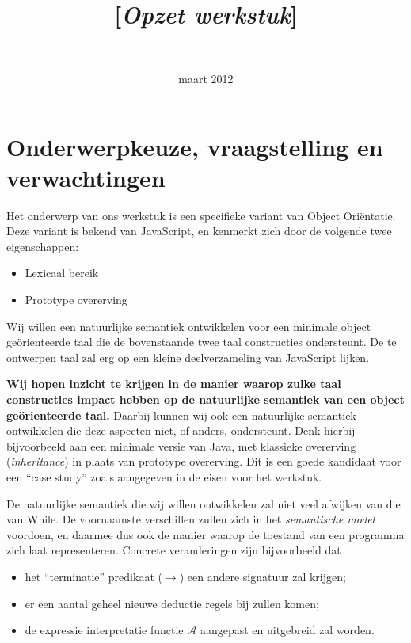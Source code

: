 \documentclass[a4paper,11pt]{article}
\title{\Title \\ {\Large [\textit{Opzet werkstuk}]}}
\author{\Kelley \\ \Tim}
\date{maart 2012}
\begin{document}
\maketitle
\thispagestyle{fancy}

\section*{Onderwerpkeuze, vraagstelling en verwachtingen}

Het onderwerp van ons werkstuk is een specifieke variant van Object Oriëntatie. Deze variant is bekend van JavaScript, en kenmerkt zich door de volgende twee eigenschappen:

\begin{itemize}
	\item Lexicaal bereik
	\item Prototype overerving
\end{itemize}

Wij willen een natuurlijke semantiek ontwikkelen voor een minimale object geörienteerde taal die de bovenstaande twee taal constructies ondersteunt. De te ontwerpen taal zal erg op een kleine deelverzameling van JavaScript lijken.

\textbf{Wij hopen inzicht te krijgen in de manier waarop zulke taal constructies impact hebben op de natuurlijke semantiek van een object geörienteerde taal.} Daarbij kunnen wij ook een natuurlijke semantiek ontwikkelen die deze aspecten niet, of anders, ondersteunt. Denk hierbij bijvoorbeeld aan een minimale versie van Java, met klassieke overerving (\emph{inheritance}) in plaats van prototype overerving. Dit is een goede kandidaat voor een “case study” zoals aangegeven in de eisen voor het werkstuk.

De natuurlijke semantiek die wij willen ontwikkelen zal niet veel afwijken van die van While. De voornaamste verschillen zullen zich in het \emph{semantische model} voordoen, en daarmee dus ook de manier waarop de toestand van een programma zich laat representeren. Concrete veranderingen zijn bijvoorbeeld dat

\begin{itemize}
	\item het “terminatie” predikaat ($\longrightarrow$) een andere signatuur zal krijgen;
	\item er een aantal geheel nieuwe deductie regels bij zullen komen;
	\item de expressie interpretatie functie $\mathcal{A}$ aangepast en uitgebreid zal worden.
\end{itemize}
\end{document}
